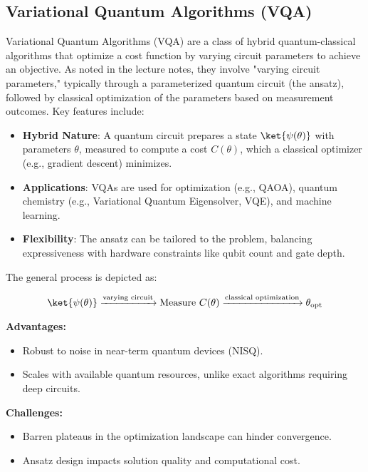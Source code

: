 \subsection*{Variational Quantum Algorithms (VQA)}

Variational Quantum Algorithms (VQA) are a class of hybrid quantum-classical
algorithms that optimize a cost function by varying circuit parameters to
achieve an objective. As noted in the lecture notes, they involve "varying
circuit parameters," typically through a parameterized quantum circuit (the
ansatz), followed by classical optimization of the parameters based on
measurement outcomes. Key features include:

\begin{itemize}
  \item \textbf{Hybrid Nature}: A quantum circuit prepares a state
    $\ket{\psi(\theta)}$ with parameters $\theta$, measured to compute a cost
    $C(\theta)$, which a classical optimizer (e.g., gradient descent) minimizes.

  \item \textbf{Applications}: VQAs are used for optimization (e.g., QAOA),
    quantum chemistry (e.g., Variational Quantum Eigensolver, VQE), and
    machine learning.

  \item \textbf{Flexibility}: The ansatz can be tailored to the problem,
    balancing expressiveness with hardware constraints like qubit count and
    gate depth.
\end{itemize}

The general process is depicted as:

\[
  \ket{\psi(\theta)} \xrightarrow{\text{varying circuit}} \text{Measure }
  C(\theta) \xrightarrow{\text{classical optimization}} \theta_{\text{opt}}
\]

\vspace{0.3cm}

\noindent
\textbf{Advantages:}
\begin{itemize}
  \item Robust to noise in near-term quantum devices (NISQ).

  \item Scales with available quantum resources, unlike exact algorithms
    requiring deep circuits.
\end{itemize}

\vspace{0.3cm}

\noindent
\textbf{Challenges:}
\begin{itemize}
  \item Barren plateaus in the optimization landscape can hinder convergence.

  \item Ansatz design impacts solution quality and computational cost.

\end{itemize}

